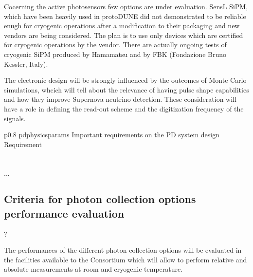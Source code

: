 Cocerning the active photosensors few options are under evaluation.
SensL SiPM, which have been heavily used in protoDUNE did not demonstrated to 
be reliable enugh for cryogenic operations after a modification to their 
packaging and new vendors are being considered. 
The plan is to use only devices which are certified for cryogenic operations 
by the vendor. There are actually ongoing tests of cryogenic SiPM produced by
 Hamamatsu and by FBK (Fondazione Bruno Kessler, Italy).

The electronic design will be strongly influenced by the outcomes of Monte 
Carlo simulations, whcich will tell about the relevance of having pulse 
shape capabilities and how they improve Supernova neutrino detection. These
consideration will have a role in defining the read-out scheme and the digitization
frequency of the signals.  



\begin{dunetable}
{p{0.8\textwidth}}
{pdphysicsparams}
{Important requirements on the PD system design}   
Requirement  \\ \toprowrule
  \\ \colhline
   \\ \colhline
 ...\\ 
\end{dunetable}


\subsection{Criteria for photon collection options performance evaluation}?

The performances of the different photon collection options will be 
evaluated in 
the facilities available to the Consortium which will allow to perform 
relative and absolute measurements at room and cryogenic temperature.


